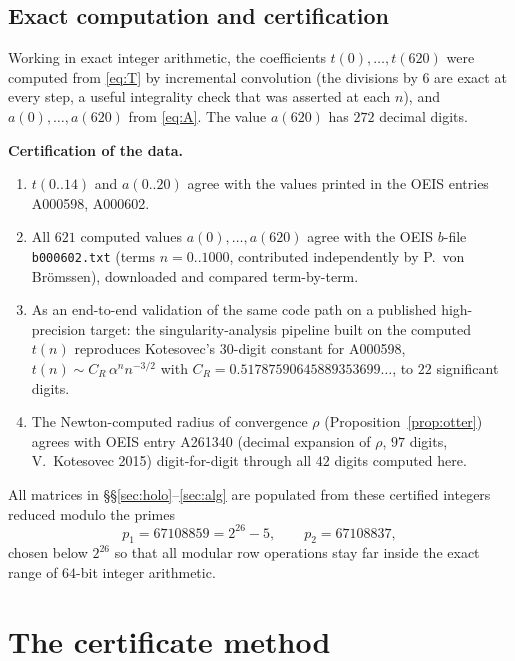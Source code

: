 \documentclass[11pt]{article}
\theoremstyle{definition}
\newcommand{\seqA}{\textnormal{A000602}}
\newcommand{\seqT}{\textnormal{A000598}}
\begin{document}
\subsection{Exact computation and certification}\label{subsec:cert}

Working in exact integer arithmetic, the coefficients $t(0),\dots,t(620)$ were
computed from \eqref{eq:T} by incremental convolution (the divisions by $6$ are
exact at every step, a useful integrality check that was asserted at each $n$),
and $a(0),\dots,a(620)$ from \eqref{eq:A}. The value $a(620)$ has $272$ decimal
digits.

\medskip
\noindent\textbf{Certification of the data.}
\begin{enumerate}
\item $t(0..14)$ and $a(0..20)$ agree with the values printed in the OEIS
entries \seqT{}, \seqA{}.
\item All $621$ computed values $a(0),\dots,a(620)$ agree with the OEIS
$b$-file \texttt{b000602.txt} (terms $n=0..1000$, contributed independently by
P.~von Br\"omssen), downloaded and compared term-by-term.
\item As an end-to-end validation of the same code path on a published
high-precision target: the singularity-analysis pipeline built on the computed
$t(n)$ reproduces Kotesovec's $30$-digit constant for \seqT{},
$t(n)\sim C_R\,\alpha^{n}n^{-3/2}$ with
$C_R=0.51787590645889353699\ldots$, to $22$ significant digits.
\item The Newton-computed radius of convergence $\rho$
(Proposition~\ref{prop:otter}) agrees with OEIS entry A261340 (decimal
expansion of $\rho$, $97$ digits, V.~Kotesovec 2015) digit-for-digit through
all $42$ digits computed here.
\end{enumerate}
All matrices in \S\S\ref{sec:holo}--\ref{sec:alg} are populated from these
certified integers reduced modulo the primes
\begin{equation}\label{eq:primes}
p_1=67108859=2^{26}-5,\qquad p_2=67108837 ,
\end{equation}
chosen below $2^{26}$ so that all modular row operations stay far inside the
exact range of $64$-bit integer arithmetic.

\section{The certificate method}\label{sec:method}
\end{document}
